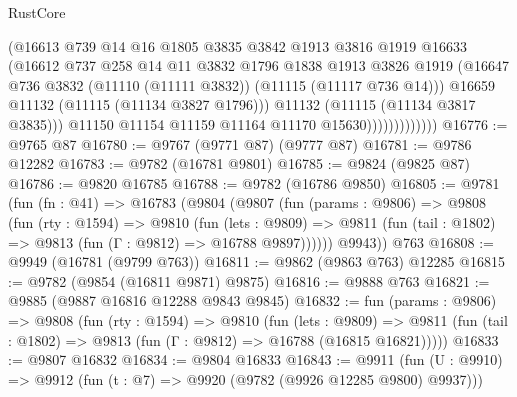 \begin{lexlean}{RustCore}
\begin{coremodule}
                              (@16613
                                @739
                                @14
                                @16
                                @1805
                                @3835
                                @3842
                                @1913
                                @3816
                                @1919
                                @16633
                                (@16612
                                  @737
                                  @258
                                  @14
                                  @11
                                  @3832
                                  @1796
                                  @1838
                                  @1913
                                  @3826
                                  @1919
                                  (@16647
                                    @736
                                    @3832
                                    (@11110 (@11111 @3832))
                                    (@11115 (@11117 @736 @14)))
                                  @16659
                                  @11132
                                  (@11115 (@11134 @3827 @1796)))
                                @11132
                                (@11115 (@11134 @3817 @3835)))
                              @11150
                              @11154
                              @11159
                              @11164
                              @11170
                              @15630)))))))))))))
@16776 := @9765 @87
@16780 := @9767 (@9771 @87) (@9777 @87)
@16781 := @9786 @12282
@16783 := @9782 (@16781 @9801)
@16785 := @9824 (@9825 @87)
@16786 := @9820 @16785
@16788 := @9782 (@16786 @9850)
@16805 := @9781
    (fun (fn : @41) =>
    @16783
      (@9804
        (@9807
          (fun (params : @9806) =>
          @9808
            (fun (rty : @1594) =>
            @9810
              (fun (lets : @9809) =>
              @9811 (fun (tail : @1802) => @9813 (fun (Γ : @9812) => @16788 @9897))))))
        @9943))
    @763
@16808 := @9949 (@16781 (@9799 @763))
@16811 := @9862 (@9863 @763) @12285
@16815 := @9782 (@9854 (@16811 @9871) @9875)
@16816 := @9888 @763
@16821 := @9885 (@9887 @16816 @12288 @9843 @9845)
@16832 := fun (params : @9806) =>
  @9808
    (fun (rty : @1594) =>
    @9810
      (fun (lets : @9809) =>
      @9811 (fun (tail : @1802) => @9813 (fun (Γ : @9812) => @16788 (@16815 @16821)))))
@16833 := @9807 @16832
@16834 := @9804 @16833
@16843 := @9911
    (fun (U : @9910) => @9912 (fun (t : @7) => @9920 (@9782 (@9926 @12285 @9800) @9937)))

\end{coremodule}
\end{lexlean}
